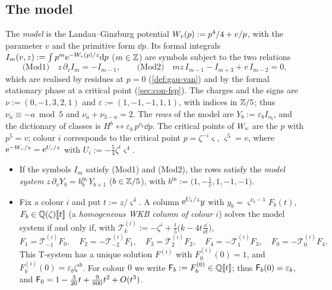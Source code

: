 
\subsection{The model}
\label{sec:set-model}

\begin{defn}
\label{def:set-model}
The \emph{model} is the Landau--Ginzburg potential $W_{v}(p):=p^4/4+v/p$, with the parameter $v$ and the primitive form $\dd p$. Its formal integrals $I_m(v,z):=\int p^m\mathrm{e}^{-W_{v}(p)/z}\mathrm{d} p$ ($m\in\mathbb{Z}$) are symbols subject to the two relations
\[
\text{(Mod1)}\quad z\,\partial_vI_m=-I_{m-1},\qquad\text{(Mod2)}\quad mz\,I_{m-1}-I_{m+3}+v\,I_{m-2}=0,
\]
which are realised by residues at $p=0$ (\cref{def:gau-van}) and by the formal stationary phase at a critical point (\cref{sec:con-fsp}). The charges and the signs are $\nu:=(0,-1,3,2,1)$ and $\varepsilon:=(1,-1,-1,1,1)$, with indices in $\mathbb{Z}/5$; thus $\nu_a\equiv-a\bmod5$ and $\nu_a+\nu_{3-a}=2$. The \emph{rows} of the model are $Y_b:=\varepsilon_bI_{\nu_b}$, and the dictionary of classes is $H^b\leftrightarrow\varepsilon_b\,p^{\nu_b}\dd p$. The critical points of $W_{v}$ are the $p$ with $p^5=v$; colour $i$ corresponds to the critical point $p=\zeta^{-i}\varsigma$, $\varsigma^5=v$, where $\mathrm{e}^{-W_{v}/z}=\mathrm{e}^{U_i/z}$ with $U_i:=-\frac54\zeta^i\varsigma^4$.
\end{defn}

\begin{prop}
\label{prop:set-modrows}
\begin{itemize}
\item[(a)] If the symbols $I_m$ satisfy (Mod1) and (Mod2), the rows satisfy the \emph{model system} $z\,\partial_vY_b=b^{\mathrm m}_b\,Y_{b+1}$ ($b\in\mathbb{Z}/5$), with $b^{\mathrm m}:=\bigl(1,-\frac1v,1,-1,-1\bigr)$.
\item[(b)] Fix a colour $i$ and put $t:=z/\varsigma^4$. A column $\mathrm{e}^{U_i/z}y$ with $y_b=\varsigma^{\nu_b-1}F_b(t)$, $F_b\in\mathbb{Q}(\zeta)[\![ t ]\!]$ (a \emph{homogeneous WKB column of colour $i$}) solves the model system if and only if, with $\mathcal T^{(i)}_k:=-\zeta^i+\frac t5\bigl(k-4t\frac{\dd}{\dd t}\bigr)$,
\[
F_1=\mathcal T^{(i)}_{-1}F_0,\quad F_2=-\mathcal T^{(i)}_{-2}F_1,\quad F_3=\mathcal T^{(i)}_2F_2,\quad F_4=-\mathcal T^{(i)}_1F_3,\quad F_0=-\mathcal T^{(i)}_0F_4.
\]
This T-system has a unique solution $F^{(i)}$ with $F^{(i)}_0(0)=1$, and $F^{(i)}_b(0)=\varepsilon_b\zeta^{ib}$. For colour $0$ we write $\mathsf{F}_b:=F^{(0)}_b\in\mathbb{Q}[\![ t ]\!]$; thus $\mathsf{F}_b(0)=\varepsilon_b$, and $\mathsf{F}_0=1-\frac3{20}t+\frac9{800}t^2+O(t^3)$.
\end{itemize}
\end{prop}

